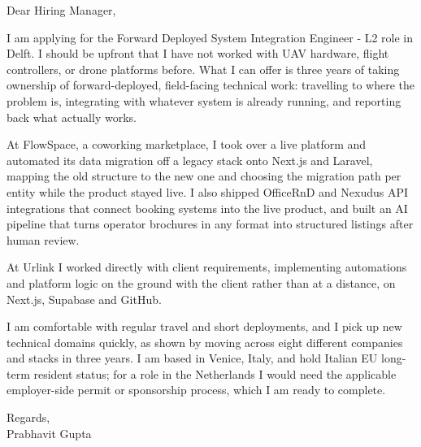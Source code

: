 \documentclass[a4paper,11pt]{article}
\begin{document}
Dear Hiring Manager,

I am applying for the Forward Deployed System Integration Engineer - L2 role in Delft. I should be upfront that I have not worked with UAV hardware, flight controllers, or drone platforms before. What I can offer is three years of taking ownership of forward-deployed, field-facing technical work: travelling to where the problem is, integrating with whatever system is already running, and reporting back what actually works.

At FlowSpace, a coworking marketplace, I took over a live platform and automated its data migration off a legacy stack onto Next.js and Laravel, mapping the old structure to the new one and choosing the migration path per entity while the product stayed live. I also shipped OfficeRnD and Nexudus API integrations that connect booking systems into the live product, and built an AI pipeline that turns operator brochures in any format into structured listings after human review.

At Urlink I worked directly with client requirements, implementing automations and platform logic on the ground with the client rather than at a distance, on Next.js, Supabase and GitHub.

I am comfortable with regular travel and short deployments, and I pick up new technical domains quickly, as shown by moving across eight different companies and stacks in three years. I am based in Venice, Italy, and hold Italian EU long-term resident status; for a role in the Netherlands I would need the applicable employer-side permit or sponsorship process, which I am ready to complete.

Regards,\\
Prabhavit Gupta
\end{document}
